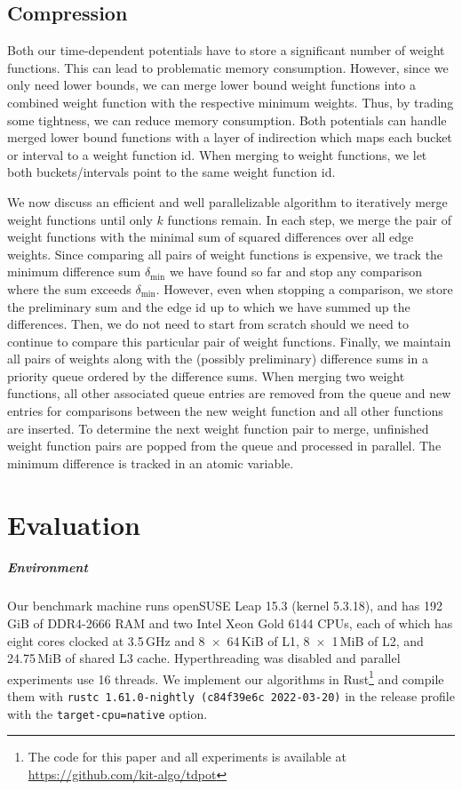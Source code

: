 \documentclass[a4paper,UKenglish,cleveref, autoref, thm-restate,anonymous]{lipics-v2021}
\begin{document}
\subsection{Compression}\label{sec:compression}

Both our time-dependent potentials have to store a significant number of weight functions.
This can lead to problematic memory consumption.
However, since we only need lower bounds, we can merge lower bound weight functions into a combined weight function with the respective minimum weights.
Thus, by trading some tightness, we can reduce memory consumption.
Both potentials can handle merged lower bound functions with a layer of indirection which maps each bucket or interval to a weight function id.
When merging to weight functions, we let both buckets/intervals point to the same weight function id.

We now discuss an efficient and well parallelizable algorithm to iteratively merge weight functions until only $k$ functions remain.
In each step, we merge the pair of weight functions with the minimal sum of squared differences over all edge weights.
Since comparing all pairs of weight functions is expensive, we track the minimum difference sum $\delta_{\min}$ we have found so far and stop any comparison where the sum exceeds $\delta_{\min}$.
However, even when stopping a comparison, we store the preliminary sum and the edge id up to which we have summed up the differences.
Then, we do not need to start from scratch should we need to continue to compare this particular pair of weight functions.
Finally, we maintain all pairs of weights along with the (possibly preliminary) difference sums in a priority queue ordered by the difference sums.
When merging two weight functions, all other associated queue entries are removed from the queue and new entries for comparisons between the new weight function and all other functions are inserted.
To determine the next weight function pair to merge, unfinished weight function pairs are popped from the queue and processed in parallel.
The minimum difference is tracked in an atomic variable.

\section{Evaluation}
\subparagraph{Environment} Our benchmark machine runs openSUSE Leap 15.3 (kernel 5.3.18), and has 192\,GiB of DDR4-2666 RAM and two Intel Xeon Gold 6144 CPUs, each of which has eight cores clocked at 3.5\,GHz and 8~$\times$~64\,KiB of L1, 8~$\times$~1\,MiB of L2, and 24.75\,MiB of shared L3 cache.
Hyperthreading was disabled and parallel experiments use 16 threads.
We implement our algorithms in Rust\footnote{The code for this paper and all experiments is available at \url{https://github.com/kit-algo/tdpot}} and compile them with \texttt{rustc 1.61.0-nightly (c84f39e6c 2022-03-20)} in the release profile with the \texttt{target-cpu=native} option.
\end{document}
